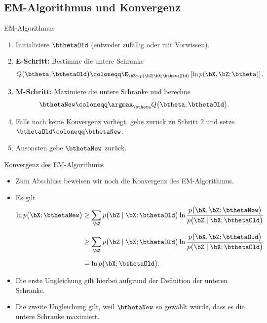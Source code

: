 \subsection{EM-Algorithmus und Konvergenz}

\begin{frame}{EM-Algorithmus}{}
	\begin{myalg}
		\begin{enumerate}
			\item Initialisiere $\bthetaOld$ (entweder zufällig oder mit Vorwissen).
			\item \textbf{E-Schritt:} Bestimme die untere Schranke
			\begin{equation*}
				Q\bigl( \btheta, \bthetaOld \bigr) \coloneqq \E_{\bZ \sim p(\bZ \mid \bX; \bthetaOld)}\left[ \ln p(\bX, \bZ; \btheta) \right].
			\end{equation*}
			\item \textbf{M-Schritt:} Maximiere die untere Schranke und berechne
			\begin{equation*}
				\bthetaNew \coloneqq \argmax_{\btheta} Q\bigl( \btheta, \bthetaOld \bigr).
			\end{equation*}
			\item Falls noch keine Konvergenz vorliegt, gehe zurück zu Schritt 2 und setze $\bthetaOld \coloneqq \bthetaNew$.
			\item Ansonsten gebe $\bthetaNew$ zurück.
		\end{enumerate}
	\end{myalg}
\end{frame}


\begin{frame}{Konvergenz des EM-Algorithmus}{}
	\begin{itemize}
		\item Zum Abschluss beweisen wir noch die Konvergenz des EM-Algorithmus.
		\item Es gilt
		\begin{align*}
			\ln p\bigl( \bX; \bthetaNew \bigr)
				&\ge \sum_{\bZ} p\bigl( \bZ \mid \bX; \bthetaOld \bigr)
					\ln \frac{p\bigl( \bX, \bZ; \bthetaNew \bigr)}{p\bigl( \bZ \mid \bX; \bthetaOld \bigr)}
		\\[2mm]
				&\ge \sum_{\bZ} p\bigl( \bZ \mid \bX; \bthetaOld \bigr)
					\ln \frac{p\bigl( \bX, \bZ; \bthetaOld \bigr)}{p\bigl( \bZ \mid \bX; \bthetaOld \bigr)}
		\\[2mm]
				&= \ln p\bigl( \bX; \bthetaOld \bigr).
		\end{align*}
		\item Die erste Ungleichung gilt hierbei aufgrund der Definition der unteren Schranke.
		\item Die zweite Ungleichung gilt, weil $\bthetaNew$ so gewählt wurde, dass es die untere Schranke maximiert.
	\end{itemize}
\end{frame}



